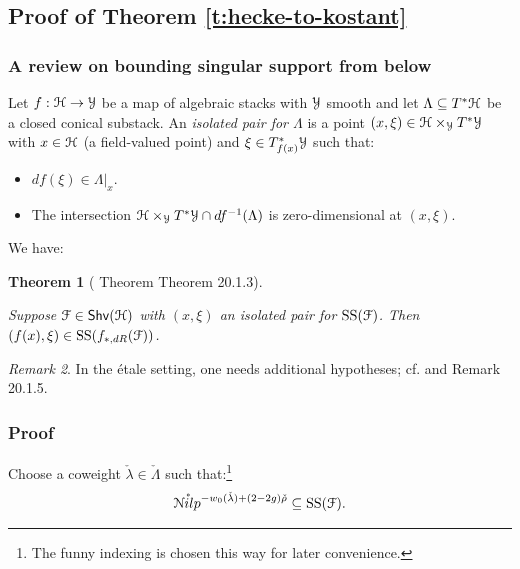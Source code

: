 \documentclass[reqno,11pt]{amsart}
\numberwithin{equation}{subsection}
\newtheorem{thm}{Theorem}[subsubsection]
\theoremstyle{remark}
\newtheorem{rem}[thm]{Remark}
\newcommand{\sF}{{\EuScript F}}
\newcommand{\sH}{{\EuScript H}}
\newcommand{\sN}{{\EuScript N}}
\newcommand{\sY}{{\EuScript Y}}
\newcommand{\on}{\operatorname}
\renewcommand{\o}[1]{\mathring{#1}}
\renewcommand{\subset}{\subseteq}
\newcommand{\Shv}{\mathsf{Shv}}
\newcommand{\Nilp}{\sN ilp}
\renewcommand{\SS}{\on{SS}}
\begin{document}
\subsection{Proof of Theorem \ref{t:hecke-to-kostant}}

\subsubsection{A review on bounding singular support from below}

Let $f:\sH \to \sY$ be a map of algebraic stacks with $\sY$ smooth
and let $\Lambda \subset T^*\sH$ be a closed conical substack.
An \emph{isolated pair for $\Lambda$} is a point $(x,\xi) \in \sH \times_{\sY} T^*\sY$  
with $x \in \sH$ (a field-valued point) and $\xi \in T_{f(x)}^*\sY$
such that:

\begin{itemize}

\item $df(\xi) \in \Lambda|_x$.

\item The intersection $\sH \times_{\sY} T^*\sY \cap df^{-1}(\Lambda)$
is zero-dimensional at $(x,\xi)$.

\end{itemize}

We have:

\begin{thm}[\cite{agkrrv1} Theorem Theorem 20.1.3]\label{t:isolated-ss}

Suppose $\sF \in \Shv(\sH)$ with $(x,\xi)$ an isolated pair
for $\SS(\sF)$. Then $(f(x),\xi) \in \SS(f_{*,dR}(\sF))$.

\end{thm}

\begin{rem}

In the \'etale setting, one needs additional hypotheses;
cf. \cite{saito-cc} and \cite{agkrrv1} Remark 20.1.5.

\end{rem}

\subsubsection{Proof}

Choose a coweight $\check{\lambda} \in \check{\Lambda}$ such that:\footnote{The
funny indexing is chosen this way for later convenience.}
%
\[
\o{\Nilp}^{-w_0(\check{\lambda})+(2-2g)\check{\rho}} \subset \SS(\sF).
\]
\end{document}
